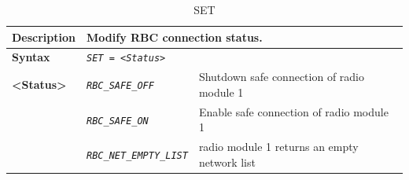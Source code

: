 \begin{itemize}
			\begin{longtable}{|l|l|l|}
				\caption{SET}\\
				\hline

					\begin{minipage}[t]{0.22\linewidth} \textbf{Description} \end{minipage}
				&	\multicolumn{2}{l|}{ \begin{minipage}[t]{0.78\linewidth} Modify RBC connection status. \end{minipage} } \\

				\hline

					\begin{minipage}[t]{0.22\linewidth} \textbf{Syntax}	\end{minipage}
				&	\multicolumn{2}{l|}{ \begin{minipage}[t]{0.78\linewidth} \emph{\texttt{SET = <Status>}}  \end{minipage} } \\

				\hline

					\multirow{1}{*}{ \begin{minipage}[t]{0.22\linewidth} \textbf{<Status>} \end{minipage} }
				&	\begin{minipage}[t]{0.40\linewidth} \emph{\texttt{RBC\_SAFE\_OFF}} \end{minipage}
				&	\begin{minipage}[t]{0.38\linewidth} Shutdown safe connection of radio module 1 \end{minipage} \\

				\hline

				&	\begin{minipage}[t]{0.40\linewidth}\emph{\texttt{RBC\_SAFE\_ON}} \end{minipage}
				&	\begin{minipage}[t]{0.38\linewidth} Enable safe connection of radio module 1 \end{minipage} \\

				\hline

				&	\begin{minipage}[t]{0.40\linewidth} \emph{\texttt{RBC\_NET\_EMPTY\_LIST}} \end{minipage}
				&	\begin{minipage}[t]{0.38\linewidth} radio module 1 returns an empty network list \end{minipage} \\


\end{longtable}
\end{itemize}
